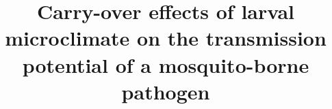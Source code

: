 \documentclass{bmcart}
\begin{document}
\begin{frontmatter}

\begin{fmbox}


\title{Carry-over effects of larval microclimate on the transmission potential of a mosquito-borne pathogen}


\author[
   addressref={aff1},                   %
   corref={aff1},                       %
   noteref={n1},                        %
   email={jane.e.doe@cambridge.co.uk}   %
]{ }
\author[
   addressref={aff1,aff2},
   email={john.RS.Smith@cambridge.co.uk}
]{ }


\address[id=aff1]{%
  , %
  ,                     %
  ,                              %
}
\address[id=aff2]{%
  ,
  ,
  ,
}


\end{fmbox}
\end{frontmatter}
\end{document}
